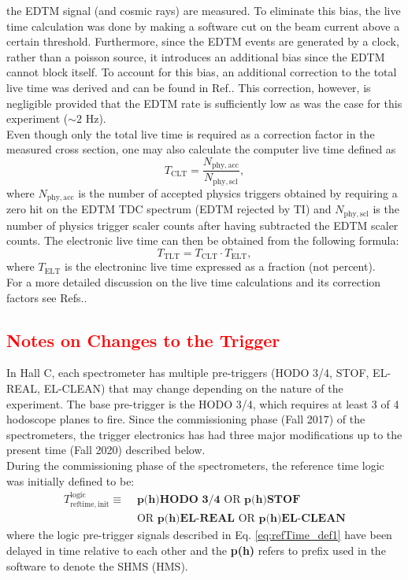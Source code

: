 \documentclass[11pt]{article}
\begin{document}
the EDTM signal (and cosmic rays) are measured. To eliminate this bias, the live time calculation was done by making a software cut on the beam current above a certain threshold.
Furthermore, since the EDTM events are generated by a clock, rather than a poisson source, it introduces an additional bias since the EDTM cannot block itself. To account for this bias, an additional correction
to the total live time was derived and can be found in Ref.\cite{DMack_livetime_2019}. This correction, however, is negligible provided that the EDTM rate is sufficiently low as was the case for this experiment ($\sim 2$ Hz). \\
\indent Even though only the total live time is required as a correction factor in the measured cross section, one may also calculate the computer live time defined as
\begin{equation}
  T_{\mathrm{CLT}} = \frac{N_{\mathrm{phy,acc}}}{N_{\mathrm{phy,scl}}},
  \label{eq:3.25}
\end{equation}
where $N_{\mathrm{phy,acc}}$ is the number of accepted physics triggers obtained by requiring a zero hit on the EDTM TDC spectrum (EDTM rejected by TI) and $N_{\mathrm{phy,scl}}$ is the number of physics trigger scaler counts after
having subtracted the EDTM scaler counts. The electronic live time can then be obtained from the following formula:
\begin{equation}
  T_{\mathrm{TLT}} = T_{\mathrm{CLT}} \cdot T_{\mathrm{ELT}},
  \label{eq:3.26}
\end{equation}
where $T_{\mathrm{ELT}}$ is the electroninc live time expressed as a fraction (not percent). \\
\indent For a more detailed discussion on the live time calculations and its correction factors
see Refs.\cite{pooser_livetime_2019,DMack_livetime_2019}.
\newpage
\textcolor{red}{\section{Notes on Changes to the Trigger}}\label{sec:trg_ch}
\indent In Hall C, each spectrometer has multiple pre-triggers (HODO 3/4, STOF, EL-REAL, EL-CLEAN) that may change depending on the nature of the experiment.
The base pre-trigger is the HODO 3/4, which requires at least 3 of 4 hodoscope planes to fire. Since the commissioning phase (Fall 2017) of the spectrometers, the trigger
electronics has had three major modifications up to the present time (Fall 2020) described below.\\
\indent During the commissioning phase of the spectrometers, the reference time logic was initially defined to be:
\begin{align}
  T^{\mathrm{logic}}_{\mathrm{reftime,init}} \equiv &\textbf{ p(h)HODO 3/4} \text{ OR } \textbf{p(h)STOF} \nonumber  \\
  &\text{ OR } \textbf{p(h)EL-REAL} \text{ OR } \textbf{p(h)EL-CLEAN}
  \label{eq:refTime_def1}
\end{align}
where the logic pre-trigger signals described in Eq. \ref{eq:refTime_def1} have been delayed in time relative to each other and the \textbf{p(h)} refers to prefix used in the software to denote the SHMS (HMS).\\
\end{document}
